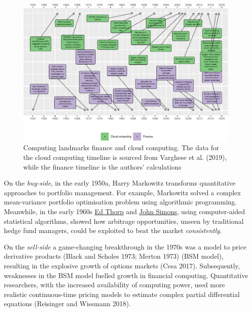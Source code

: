 \documentclass{article}
\begin{document}
\begin{figure}

{\centering \includegraphics[width=1\linewidth]{qrap_files/figure-latex/timeline-1} 

}

\caption{ Computing landmarks finance and cloud computing.   The data for the cloud computing timeline is sourced from Varghese et al. (2019), while the finance timeline is the authors' calculations}\label{fig:timeline}
\end{figure}

On the \emph{buy-side}, in the early 1950a, Harry Markowitz transforms
quantitative approaches to portfolio management. For example, Markowitz
solved a complex mean-variance portfolio optimisation problem using
algorithmic programming. Meanwhile, in the early 1960s
\href{https://en.wikipedia.org/wiki/Edward_O._Thorp}{Ed Thorp} and
\href{https://en.wikipedia.org/wiki/Jim_Simons_(mathematician)}{John
Simons}, using computer-aided statistical algorithms, showed how
arbitrage opportunities, unseen by traditional hedge fund managers,
could be exploited to beat the market \emph{consistently}.

On the \emph{sell-side} a game-changing breakthrough in the 1970s was a
model to price derivative products (Black and Scholes 1973; Merton 1973)
(BSM model), resulting in the explosive growth of options markets (Cesa
2017). Subsequently, weaknesses in the BSM model fuelled growth in
financial computing. Quantitative researchers, with the increased
availability of computing power, used more realistic continuous-time
pricing models to estimate complex partial differential equations
(Reisinger and Wissmann 2018).
\end{document}
